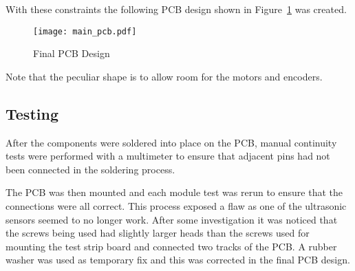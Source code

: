 With these constraints the following PCB design shown in Figure~\ref{PCB_Design} was created.

\begin{figure}[!ht]
	\centering
	\texttt{[image: main\_pcb.pdf]}
	\caption{Final PCB Design}\label{PCB_Design}

\end{figure}
Note that the peculiar shape is to allow room for the motors and encoders.

\subsection{Testing}\label{elec/pcb/test}
After the components were soldered into place on the PCB, manual
continuity tests were performed with a multimeter to ensure that adjacent
pins had not been connected in the soldering process.

The PCB was then mounted and each module test was rerun to ensure that the
connections were all correct. This process exposed a flaw as one of the
ultrasonic sensors seemed to no longer work. After some investigation it
was noticed that the screws being used had slightly larger heads than the
screws used for mounting the test strip board and connected two
tracks of the PCB. A rubber washer was used as temporary fix and this was
corrected in the final PCB design.
